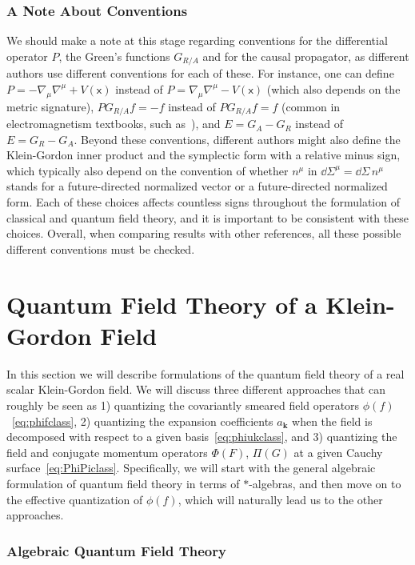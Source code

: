 \documentclass[letterpaper,12pt,titlepage,oneside,final]{book}
\newcommand{\mf}{\mathsf}%
\begin{document}
\subsubsection*{A Note About Conventions}

We should make a note at this stage regarding conventions for the differential operator $P$, the Green's functions $G_{R/A}$ and for the causal propagator, as different authors use different conventions for each of these. For instance, one can define~\cite{kasiaFewsterIntro} $P = - \nabla_\mu\nabla^\mu +V(\mf x)$ instead of $P = \nabla_\mu \nabla^\mu - V(\mf x)$ (which also depends on the metric signature), $PG_{R/A}f = -f$ instead of $PG_{R/A}f = f$ (common in electromagnetism textbooks, such as~\cite{Jackson}), and $E = G_A-G_R$ instead of $E = G_R - G_A$. Beyond these conventions, different authors might also define the Klein-Gordon inner product and the symplectic form with a relative minus sign, which typically also depend on the convention of whether $n^\mu$ in $\dd\Sigma^\mu = \dd\Sigma \, n^\mu$ stands for a future-directed normalized vector or a future-directed normalized form. Each of these choices affects countless signs throughout the formulation of classical and quantum field theory, and it is important to be consistent with these choices. Overall, when comparing results with other references, all these possible different conventions must be checked.



\section{Quantum Field Theory of a Klein-Gordon Field}\label{sec:QFT}

In this section we will describe formulations of the quantum field theory of a real scalar Klein-Gordon field. We will discuss three different approaches that can roughly be seen as 1) quantizing the covariantly smeared field operators $\phi(f)$~\eqref{eq:phifclass}, 2) quantizing the expansion coefficients $a_{\bm k}$ when the field is decomposed with respect to a given basis~\eqref{eq:phiukclass}, and 3) quantizing the field and conjugate momentum operators $\Phi(F)$, $\Pi(G)$ at a given Cauchy surface~\eqref{eq:PhiPiclass}. Specifically, we will start with the general algebraic formulation of quantum field theory in terms of $\ast$-algebras, and then move on to the effective quantization of $\phi(f)$, which will naturally lead us to the other approaches. 

\subsubsection*{Algebraic Quantum Field Theory}
\end{document}
